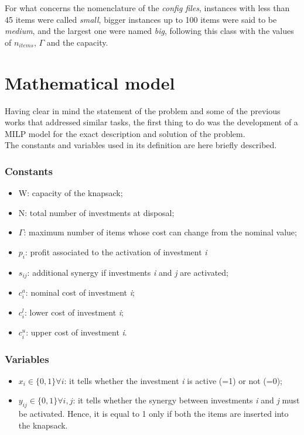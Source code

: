\documentclass{article}
\begin{document}
For what concerns the nomenclature of the \emph{config files}, instances with less than 45 items were called \emph{small}, bigger instances up to 100 items were said to be \emph{medium}, and the largest one were named \emph{big}, following this class with the values of $n_{items}$, $\Gamma$ and the capacity.

\section{Mathematical model}
Having clear in mind the statement of the problem and some of the previous works that addressed similar tasks, the first thing to do was the development of a MILP model for the exact description and solution of the problem. \\

The constants and variables used in its definition are here briefly described.

\subsubsection*{Constants}
\begin{itemize}
    \item W: capacity of the knapsack;
    \item N: total number of investments at disposal;
    \item $\Gamma$: maximum number of items whose cost can change from the nominal value;
    \item $p_i$: profit associated to the activation of investment \emph{i}
    \item $s_{ij}$: additional synergy if investments \emph{i} and \emph{j} are activated;
    \item $c_i^a$: nominal cost of investment \emph{i};
    \item $c_i^l$: lower cost of investment \emph{i};
    \item $c_i^u$: upper cost of investment \emph{i}.
\end{itemize}
\subsubsection*{Variables}
\begin{itemize}
\item $x_i \in \{0,1\}$\space$\forall i$: it tells whether the investment \emph{i} is active (=1) or not (=0);
\item $y_{ij} \in  \{0,1\}$\space$\forall i,j$: it tells whether the synergy between investments \emph{i} and \emph{j} must be activated. Hence, it is equal to 1 only if both the items are inserted into the knapsack.

\end{itemize}
\end{document}

